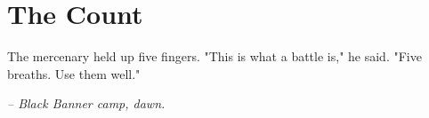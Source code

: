 \chapter*{The Count}

The mercenary held up five fingers. "This is what a battle is," he said. "Five breaths. Use them well."

\smallskip

\noindent \textit{-- Black Banner camp, dawn.}

